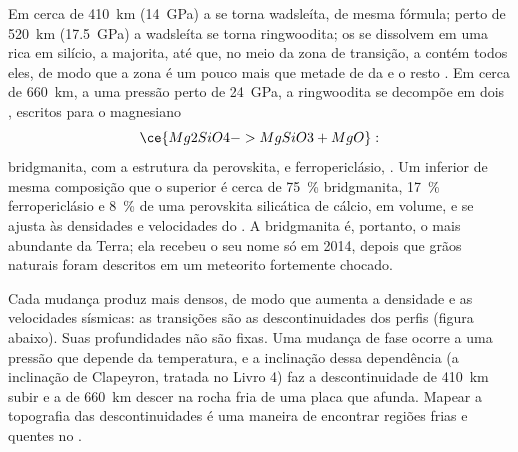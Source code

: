 Em cerca de \qty{410}{km} (\qty{14}{GPa}) a   se torna wadsleíta, de mesma fórmula; perto de \qty{520}{km} (\qty{17.5}{GPa}) a wadsleíta se torna ringwoodita; os  se dissolvem em uma  rica em silício, a majorita, até que, no meio da zona de transição, a  contém todos eles, de modo que a zona é um pouco mais que metade de  da  e o resto . Em cerca de \qty{660}{km}, a uma pressão perto de \qty{24}{GPa}, a ringwoodita se decompõe em
dois , escritos para o  magnesiano
\[
  \ce{Mg2SiO4 -> MgSiO3 + MgO}:
\]
bridgmanita,  com a estrutura da perovskita, e ferropericlásio, . Um  inferior de mesma composição que o  superior é cerca de \qty{75}{\percent} bridgmanita, \qty{17}{\percent} ferropericlásio e \qty{8}{\percent} de uma perovskita silicática de cálcio, em volume, e se ajusta às densidades e velocidades do . A bridgmanita é, portanto, o  mais abundante da Terra; ela recebeu o seu nome só em 2014, depois que grãos naturais foram descritos em um meteorito fortemente chocado.

Cada mudança produz  mais densos, de modo que aumenta a densidade e as velocidades sísmicas: as transições são as descontinuidades dos perfis (figura abaixo). Suas profundidades não são fixas. Uma mudança de fase ocorre a uma pressão que depende da temperatura, e a inclinação dessa dependência (a inclinação de Clapeyron, tratada no Livro 4) faz a descontinuidade de \qty{410}{km} subir e a de \qty{660}{km} descer na rocha fria de uma placa que afunda. Mapear a topografia das descontinuidades é uma maneira de encontrar regiões frias e quentes no .

